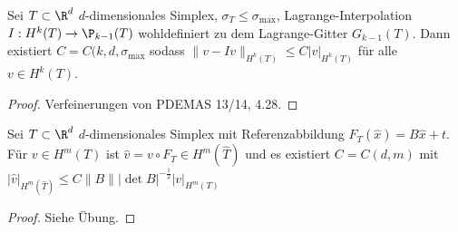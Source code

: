 \begin{st} \label{3.76}
	Sei $T \subset \R^d$ $d$-dimensionales Simplex, $\sigma_T \le \sigma_{\text{max}}$, Lagrange-Interpolation $I: H^k(T) \to \P_{k-1}(T)$ wohldefiniert zu dem Lagrange-Gitter $G_{k-1}(T)$.
	Dann existiert $C = C(k,d,\sigma_{\text{max}}$ sodass
	\begin{math}
		\|v - Iv\|_{H^k(T)} \le C |v|_{H^k(T)}
	\end{math}
	für alle $v \in H^k(T)$.
	\begin{proof}
		Verfeinerungen von PDEMAS 13/14, 4.28.
	\end{proof}
\end{st}

\begin{st}[Transformationsformeln] \label{3.77}
	Sei $T \subset \R^d$ $d$-dimensionales Simplex mit Referenzabbildung $F_T(\hat x) = B\hat x + t$.
	Für $v \in H^m(T)$ ist $\hat v = v \circ F_T \in H^m(\hat T)$ und es existiert $C = C(d,m)$ mit
	\begin{math}
		|\hat v|_{H^m(\hat T)} \le C \|B\| |\det B|^{-\frac{1}{2}} |v|_{H^m(T)}
	\end{math}
	\begin{proof}
		Siehe Übung.
	\end{proof}
\end{st}

